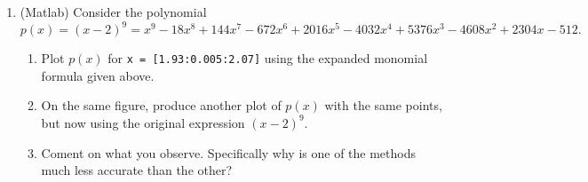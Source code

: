\documentclass[11pt]{article}
\begin{document}
\begin{enumerate}
	\item (Matlab) Consider the polynomial
	      \[p(x) = (x-2)^9 = x^9 - 18x^8 + 144x^7 - 672x^6 + 2016x^5 - 4032x^4 + 5376x^3 - 4608x^2 + 2304x -512.\]
	      \begin{enumerate}
		      \item Plot \(p(x)\)  for \verb!x = [1.93:0.005:2.07]! using the expanded monomial formula given above.

		      \item On the same figure, produce another plot of \(p(x)\) with the same points, but now using the original expression \((x-2)^9\).

		      \item Coment on what you observe.  Specifically why is one of the methods much less accurate than the other?
	      \end{enumerate}
\end{enumerate}
\end{document}
